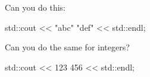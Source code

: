 Can you do this:

\begin{consolethree}[escapeinside=||]

std::cout << "abc" "def" << std::endl;

\end{consolethree}



Can you do the same for integers?

\begin{consolethree}[escapeinside=||]

std::cout << 123 456 << std::endl;

\end{consolethree}

